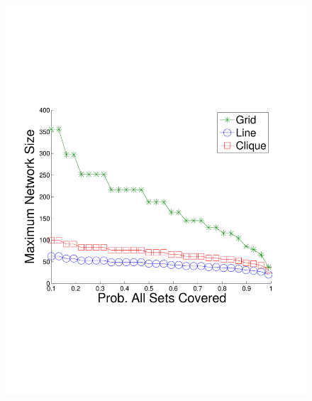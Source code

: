 \begin{figure}
{	\includegraphics[scale=0.22, clip=true, trim=14mm 65mm 23mm 65mm]{figures/use_cases_examples/cluster/num_nodes_vs_cluster_perc_cov_10_T_2_W_color.pdf}
        \label{fig:use_case_num_nodes_vs_qoi}
        }
  \subfigure[Max N vs. Timeliness (Prob. All Sets Covered = 0.8)]{
}
\end{figure}
